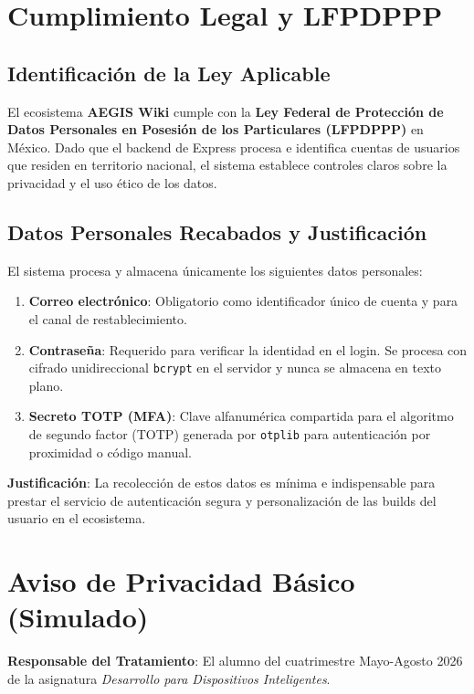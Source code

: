 \documentclass[11pt,a4paper]{article}
\begin{document}
\section{Cumplimiento Legal y LFPDPPP}

\subsection{Identificación de la Ley Aplicable}
El ecosistema \textbf{AEGIS Wiki} cumple con la \textbf{Ley Federal de Protección de Datos Personales en Posesión de los Particulares (LFPDPPP)} en México. Dado que el backend de Express procesa e identifica cuentas de usuarios que residen en territorio nacional, el sistema establece controles claros sobre la privacidad y el uso ético de los datos.

\subsection{Datos Personales Recabados y Justificación}
El sistema procesa y almacena únicamente los siguientes datos personales:
\begin{enumerate}
    \item \textbf{Correo electrónico}: Obligatorio como identificador único de cuenta y para el canal de restablecimiento.
    \item \textbf{Contraseña}: Requerido para verificar la identidad en el login. Se procesa con cifrado unidireccional \texttt{bcrypt} en el servidor y nunca se almacena en texto plano.
    \item \textbf{Secreto TOTP (MFA)}: Clave alfanumérica compartida para el algoritmo de segundo factor (TOTP) generada por \texttt{otplib} para autenticación por proximidad o código manual.
\end{enumerate}

\textbf{Justificación}: La recolección de estos datos es mínima e indispensable para prestar el servicio de autenticación segura y personalización de las builds del usuario en el ecosistema.

\section{Aviso de Privacidad Básico (Simulado)}

\textbf{Responsable del Tratamiento}: El alumno del cuatrimestre Mayo-Agosto 2026 de la asignatura \textit{Desarrollo para Dispositivos Inteligentes}.\\
\end{document}
